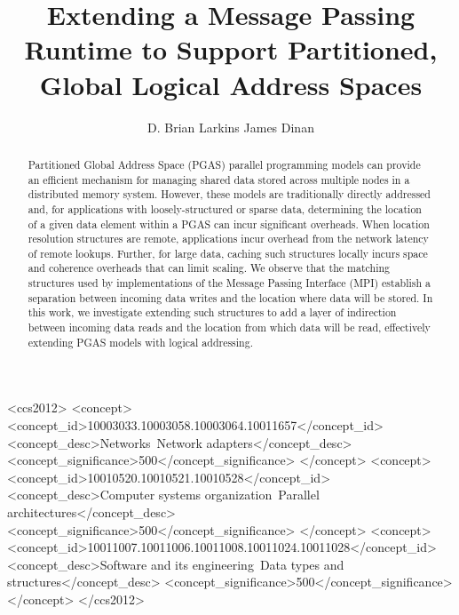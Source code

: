 \documentclass[prodmode]{acmsmall} %
\begin{document}

\title{Extending a Message Passing Runtime to Support Partitioned, Global Logical Address Spaces}
\author{D. Brian Larkins
James Dinan
}


\begin{abstract}

Partitioned Global Address Space (PGAS) parallel programming models can provide
an efficient mechanism for managing shared data stored across multiple nodes in a
distributed memory system.  However, these models are traditionally directly
addressed and, for applications with loosely-structured or sparse data,
determining the location of a given data element within a PGAS can incur
significant overheads.  When location resolution structures are remote,
applications incur overhead from the network latency of remote lookups.
Further, for large data, caching such structures locally incurs space and
coherence overheads that can limit scaling.
%
We observe that the matching structures used by implementations of the Message
Passing Interface (MPI) establish a separation between incoming data writes and
the location where data will be stored.  In this work, we investigate extending
such structures to add a layer of indirection between incoming data reads
and the location from which data will be read, effectively extending PGAS models
with logical addressing.

\end{abstract}


%
%
\begin{CCSXML}
<ccs2012>
<concept>
<concept_id>10003033.10003058.10003064.10011657</concept_id>
<concept_desc>Networks~Network adapters</concept_desc>
<concept_significance>500</concept_significance>
</concept>
<concept>
<concept_id>10010520.10010521.10010528</concept_id>
<concept_desc>Computer systems organization~Parallel architectures</concept_desc>
<concept_significance>500</concept_significance>
</concept>
<concept>
<concept_id>10011007.10011006.10011008.10011024.10011028</concept_id>
<concept_desc>Software and its engineering~Data types and structures</concept_desc>
<concept_significance>500</concept_significance>
</concept>
</ccs2012>
\end{CCSXML}
\end{document}
